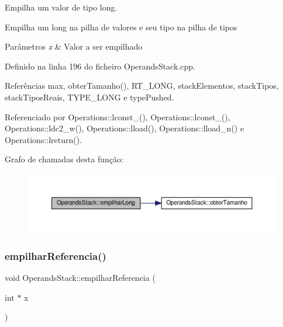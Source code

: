 Empilha um valor de tipo long. 

Empilha um long na pilha de valores e seu tipo na pilha de tipos


\begin{DoxyParams}{Parâmetros}
{\em x} & Valor a ser empilhado \\
\hline
\end{DoxyParams}


Definido na linha 196 do ficheiro Operands\+Stack.\+cpp.



Referências max, obter\+Tamanho(), R\+T\+\_\+\+L\+O\+NG, stack\+Elementos, stack\+Tipos, stack\+Tipos\+Reais, T\+Y\+P\+E\+\_\+\+L\+O\+NG e type\+Pushed.



Referenciado por Operations\+::lconst\+\_(), Operations\+::lconst\+\_(), Operations\+::ldc2\+\_\+w(), Operations\+::lload(), Operations\+::lload\+\_\+n() e Operations\+::lreturn().

Grafo de chamadas desta função\+:\nopagebreak
\begin{figure}[H]
\begin{center}
\leavevmode
\includegraphics[width=350pt]{classOperandsStack_a927ca84358d7e0f45f74d122f9a500d2_cgraph}
\end{center}
\end{figure}
\mbox{\label{classOperandsStack_a47af7d965172984b9cc5c61d8c4c1ce3}} 
\subsubsection{\texorpdfstring{empilhar\+Referencia()}{empilharReferencia()}}
{\footnotesize\ttfamily void Operands\+Stack\+::empilhar\+Referencia (\begin{DoxyParamCaption}\item[{int $\ast$}]{x }\end{DoxyParamCaption})}



